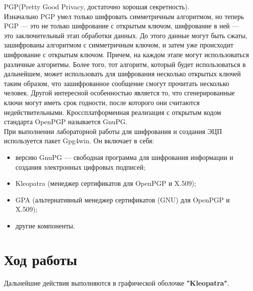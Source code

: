 \documentclass[10pt,a4paper]{report}
\begin{document}
PGP(Pretty Good Privacy, достаточно хорошая секретность).\\
Изначально PGP умел только шифровать симметричным алгоритмом, но теперь PGP — это не только шифрование с открытым ключом, шифрование в ней — это заключительный этап обработки данных. До этого данные могут быть сжаты, зашифрованы алгоритмом с симметричным ключом, и затем уже происходит шифрование с открытым ключом. Причем, на каждом этапе могут использоваться различные алгоритмы. Более того, тот алгоритм, который будет использоваться в дальнейшем, может использовать для шифрования несколько открытых ключей таким образом, что зашифрованное сообщение смогут прочитать несколько человек. Другой интересной особенностью является то, что сгенерированные ключи могут иметь срок годности, после которого они считаются недействительными. Кроссплатформенная реализация с открытым кодом стандарта OpenPGP называется GnuPG. \\
При выполнении лабораторной работы для шифрования и создания ЭЦП используется пакет Gpg4win. Он включает в себя:
\begin{itemize}
\item версию GnuPG — свободная программа для шифрования информации и создания электронных цифровых подписей;
\item Kleopatra (менеджер сертификатов для OpenPGP и X.509);
\item GPA (альтернативный менеджер сертификатов (GNU) для OpenPGP и X.509);
\item другие компоненты.
\end{itemize}


\pagebreak
\section{Ход работы}
Дальнейшие действия выполняются в графической оболочке \textbf{"Kleopatra"}.
\end{document}
